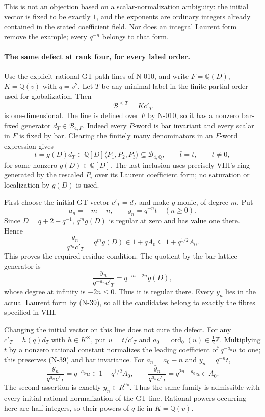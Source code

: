 This is not an objection based on a scalar-normalization ambiguity:
the initial vector is fixed to be exactly $1$, and the exponents
are ordinary integers already contained in the stated coefficient
field.  Nor does an integral Laurent form remove the example;
every $q^{-n}$ belongs to that form.

\paragraph{The same defect at rank four, for every label order.}
Use the explicit rational GT path lines of N-010, and write
$F=\mathbb Q(D)$, $K=\mathbb Q(v)$ with $q=v^2$.
Let $T$ be any minimal label in the finite partial order used for
globalization.  Then
\[
                  \mathcal B^{\le T}=Kc'_T
 \tag{N-38}
\]
is one-dimensional.  The line is defined over $F$ by N-010, so
it has a nonzero bar-fixed generator $d_T\in\mathcal B_{4,F}$.
Indeed every $P$-word is bar invariant and every scalar in $F$
is fixed by bar.  Clearing the finitely many denominators in an
$F$-word expression gives
\[
 t=g(D)d_T\in\mathbb Q[D]\langle P_1,P_2,P_3\rangle
                  \subseteq\mathcal B_{4,\mathbb Q},
 \qquad \bar t=t,\qquad t\ne0,
 \tag{N-39}
\]
for some nonzero $g(D)\in\mathbb Q[D]$.
The last inclusion uses precisely VIII's ring generated by the
rescaled $P_i$ over its Laurent coefficient form; no saturation
or localization by $g(D)$ is used.

First choose the initial GT vector $c'_T=d_T$ and make $g$ monic,
of degree $m$.  Put
\[
                 a_n=-m-n,\qquad y_n=q^{-n}t
                      \quad(n\ge0).
 \tag{N-40}
\]
Since $D=q+2+q^{-1}$,
$q^m g(D)$ is regular at zero and has value one there.  Hence
\[
 \frac{y_n}{q^{a_n}c'_T}=q^m g(D)\in1+qA_0
                                      \subseteq1+q^{1/2}A_0.
 \tag{N-41}
\]
This proves the required residue condition.  The quotient by
the bar-lattice generator is
\[
 \frac{y_n}{q^{-a_n}c'_T}=q^{-m-2n}g(D),
 \tag{N-42}
\]
whose degree at infinity is $-2n\le0$.  Thus it is regular there.
Every $y_n$ lies in the actual Laurent form by (N-39), so all the
candidates belong to exactly the fibres specified in VIII.

Changing the initial vector on this line does not cure the defect.
For any $c'_T=h(q)d_T$ with $h\in K^\times$, put
$u=t/c'_T$ and $a_0=\operatorname{ord}_0(u)\in\tfrac12\mathbb Z$.
Multiplying $t$ by a nonzero rational constant normalizes the leading
coefficient of $q^{-a_0}u$ to one; this preserves (N-39) and bar
invariance.  For $a_n=a_0-n$ and $y_n=q^{-n}t$,
\[
 \frac{y_n}{q^{a_n}c'_T}=q^{-a_0}u\in1+q^{1/2}A_0,
 \qquad
 \frac{\bar y_n}{q^{a_n}c'_T}=q^{2n-a_0}u\in A_0.
 \tag{N-43}
\]
The second assertion is exactly $y_n\in\bar R^{a_n}$.
Thus the same family is admissible with every initial rational
normalization of the GT line.  Rational powers occurring here are
half-integers, so their powers of $q$ lie in $K=\mathbb Q(v)$.

